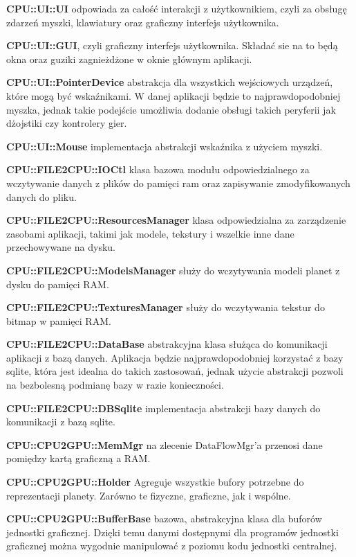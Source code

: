 \begin{description}
\item{\bf CPU::UI::UI} odpowiada za całość interakcji z użytkownikiem, czyli za obsługę zdarzeń myszki, klawiatury oraz graficzny interfejs użytkownika.
\item{\bf CPU::UI::GUI}, czyli graficzny interfejs użytkownika. Składać sie na to będą okna oraz guziki zagnieżdżone w oknie głównym aplikacji.
\item{\bf CPU::UI::PointerDevice} abstrakcja dla wszystkich wejściowych urządzeń, które mogą być wskaźnikami. W danej aplikacji będzie to najprawdopodobniej myszka, jednak takie podejście umożliwia dodanie obsługi takich peryferii jak dżojstiki czy kontrolery gier.
\item{\bf CPU::UI::Mouse} implementacja abstrakcji wskaźnika z użyciem myszki.
\item{}
\item{\bf CPU::FILE2CPU::IOCtl} klasa bazowa modułu odpowiedzialnego za wczytywanie danych z plików do pamięci ram oraz zapisywanie zmodyfikowanych danych do pliku.
\item{\bf CPU::FILE2CPU::ResourcesManager} klasa odpowiedzialna za zarządzenie zasobami aplikacji, takimi jak modele, tekstury i wszelkie inne dane przechowywane na dysku.
\item{\bf CPU::FILE2CPU::ModelsManager} służy do wczytywania modeli planet z dysku do pamięci RAM.
\item{\bf CPU::FILE2CPU::TexturesManager} służy do wczytywania tekstur do bitmap w pamięci RAM.
\item{\bf CPU::FILE2CPU::DataBase} abstrakcyjna klasa służąca do komunikacji aplikacji z bazą danych. Aplikacja będzie najprawdopodobniej korzystać z bazy sqlite, która jest idealna do takich zastosowań, jednak użycie abstrakcji pozwoli na bezbolesną podmianę bazy w razie konieczności.
\item{\bf CPU::FILE2CPU::DBSqlite} implementacja abstrakcji bazy danych do komunikacji z bazą sqlite.
\item{}
\item{\bf CPU::CPU2GPU::MemMgr} na zlecenie DataFlowMgr'a przenosi dane pomiędzy kartą graficzną a RAM.
\item{\bf CPU::CPU2GPU::Holder} Agreguje wszystkie bufory potrzebne do reprezentacji planety. Zarówno te fizyczne, graficzne, jak i wspólne.
\item{\bf CPU::CPU2GPU::BufferBase} bazowa, abstrakcyjna klasa dla buforów jednostki graficznej. Dzięki temu danymi dostępnymi dla programów jednostki graficznej można wygodnie manipulować z poziomu kodu jednostki centralnej.

\end{description}

